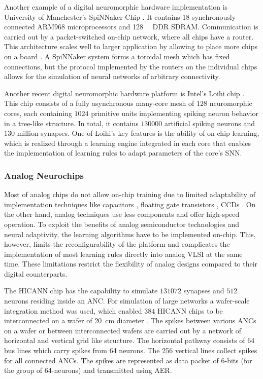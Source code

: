 Another example of a digital neuromorphic hardware implementation is University of Manchester's \ac{SpiNNaker} Chip \cite{Furber2014}.
It contains 18 synchronously connected ARM968 microprocessors and \SI{128}{\mega\byte} \ac{DDR} \ac{SDRAM}.
Communication is carried out by a packet-switched on-chip network, where all chips have a router.
This architecture scales well to larger application by allowing to place more chips on a board \cite{Painkras2013,Navaridas2009}.
A \ac{SpiNNaker} system forms a toroidal mesh which has fixed connections, but the protocol implemented by the routers on the individual chips allows for the simulation of neural networks of arbitrary connectivity.

Another recent digital neuromorphic hardware platform is Intel's Loihi chip \cite{Davies2018}.
This chip consists of a fully asynchronous many-core mesh of $128$ neuromorphic cores, each containing $1024$ primitive units implementing spiking neuron behavior in a tree-like structure.
In total, it contains $130000$ artificial spiking neurons and $130$ million synapses.
One of Loihi's key features is the ability of on-chip learning, which is realized through a learning engine integrated in each core that enables the implementation of learning rules to adapt parameters of the core's \ac{SNN}.

\subsubsection{Analog Neurochips}

Most of analog chips do not allow on-chip training due to limited adaptability of implementation techniques like capacitors \cite{Schwartz1990}, floating gate transistors \cite{Holler1989}, \acp{CCD} \cite{Agranat1990}.
On the other hand, analog techniques use less components and offer high-speed operation.
To exploit the benefits of analog semiconductor technologies and neural adaptivity, the learning algorithms have to be implemented on-chip.
This, however, limits the reconfigurability of the platform and complicates the implementation of most learning rules directly into analog VLSI at the same time.
These limitations restrict the flexibility of analog designs compared to their digital counterparts.

The \ac{HICANN} chip \cite{Schemmel2008} has the capability to simulate $131072$ synapses and $512$ neurons residing inside an \ac{ANC}.
For simulation of large networks a wafer-scale integration method was used, which enabled $384$ \ac{HICANN} chips to be interconnected on a wafer of \SI{20}{\centi\meter} diameter \cite{Schemmel2010}.
The spikes between various \acp{ANC} on a wafer or between interconnected wafers are carried out by a network of horizontal and vertical grid like structure.
The horizontal pathway consists of 64 bus lines which carry spikes from 64 neurons.
The 256 vertical lines collect spikes for all connected \acp{ANC}.
The spikes are represented as data packet of 6-bits (for the group of 64-neurons) and transmitted using \ac{AER}. 


